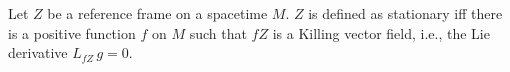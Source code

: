 Let $Z$ be a reference frame on a spacetime $M$. $Z$ is defined as stationary iff there is a positive function $f$ on $M$ such that $fZ$ is a Killing vector field, i.e., the Lie derivative $L_{fZ}\, g = 0$.

